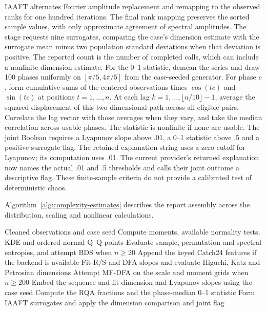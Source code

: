 IAAFT alternates Fourier amplitude replacement and remapping to the observed ranks for one hundred iterations. The final rank mapping preserves the sorted sample values, with only approximate agreement of spectral amplitudes. The stage requests nine surrogates, comparing the case's dimension estimate with the surrogate mean minus two population standard deviations when that deviation is positive. The reported count is the number of completed calls, which can include a nonfinite dimension estimate. For the 0--1 statistic, demean the series and draw 100 phases uniformly on $[\pi/5,4\pi/5]$ from the case-seeded generator. For phase $c$, form cumulative sums of the centered observations times $\cos(tc)$ and $\sin(tc)$ at positions $t=1,\ldots,n$. At each lag $k=1,\ldots,\lfloor n/10\rfloor-1$, average the squared displacement of this two-dimensional path across all eligible pairs. Correlate the lag vector with those averages when they vary, and take the median correlation across usable phases. The statistic is nonfinite if none are usable. The joint Boolean requires a Lyapunov slope above .01, a 0--1 statistic above .5 and a positive surrogate flag. The retained explanation string uses a zero cutoff for Lyapunov; its computation uses .01. The current provider's returned explanation now names the actual .01 and .5 thresholds and calls their joint outcome a descriptive flag. These finite-sample criteria do not provide a calibrated test of deterministic chaos.

Algorithm~\ref{alg:complexity-estimates} describes the report
assembly across the distribution, scaling and nonlinear calculations.
\begin{algorithm}[htbp]
\caption{Compute distribution, scaling and nonlinear diagnostics while retaining unavailable branches and finite-sample thresholds.}
\label{alg:complexity-estimates}
\begin{algorithmic}[1]
\Require Cleaned observations and case seed
\State Compute moments, available normality tests, KDE and ordered normal Q--Q points
\State Evaluate sample, permutation and spectral entropies, and attempt BDS when $n\ge20$
\State Append the keyed Catch24 features if the backend is available
\State Fit R/S and DFA slopes and evaluate Higuchi, Katz and Petrosian dimensions
\State Attempt MF-DFA on the scale and moment grids when $n\ge200$
  \State Embed the sequence and fit dimension and Lyapunov slopes using the case seed
  \State Compute the RQA fractions and the phase-median 0--1 statistic
  \State Form IAAFT surrogates and apply the dimension comparison and joint flag
\EndIf
\end{algorithmic}
\end{algorithm}

